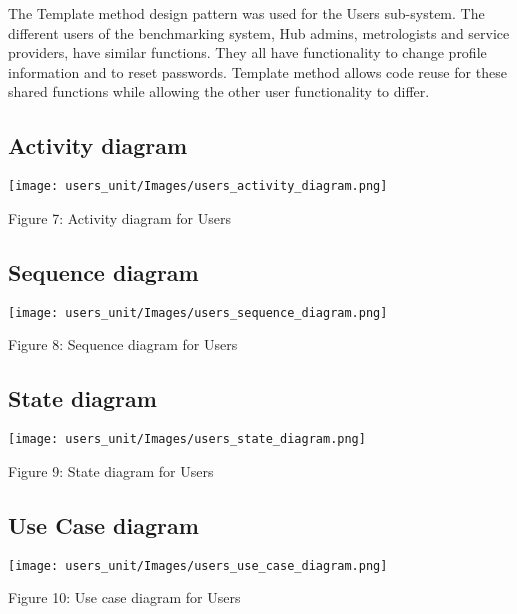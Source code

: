 	The Template method design pattern was used for the Users sub-system. The different users of the benchmarking system, Hub admins, metrologists and service providers, have similar functions. They all have functionality to change profile information and to reset passwords. Template method allows code reuse for these shared functions while allowing the other user functionality to differ.
	
		
\subsection{Activity diagram}
    \texttt{[image: users\_unit/Images/users\_activity\_diagram.png]}
	\begin{center}
	    \small{Figure 7: Activity diagram for Users}
    \end{center}


\subsection{Sequence diagram}
    \texttt{[image: users\_unit/Images/users\_sequence\_diagram.png]}
	\begin{center}
	    \small{Figure 8: Sequence diagram for Users }
    \end{center}

\subsection{State diagram}
    \texttt{[image: users\_unit/Images/users\_state\_diagram.png]}
	\begin{center}
	    \small{Figure 9: State diagram for Users}
    \end{center}




\subsection{Use Case diagram}
   \texttt{[image: users\_unit/Images/users\_use\_case\_diagram.png]}
    \begin{center}
    	\small{Figure 10: Use case diagram for Users}
    \end{center}